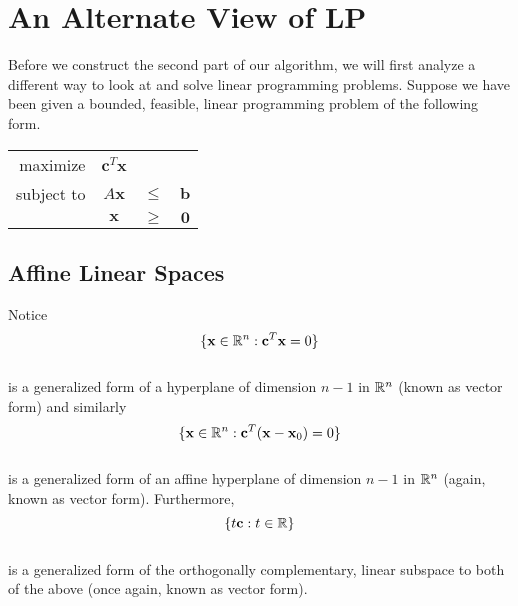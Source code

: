 \documentclass[conference]{IEEEtran}
\numberwithin{equation}{section}
\numberwithin{figure}{section}
\theoremstyle{plain}
\theoremstyle{definition}
\newcommand{\R}{\ensuremath \mathbb{R}}
\newcommand{\1}{\ensuremath \mathbbm{1}}
\begin{document}
\section{An Alternate View of LP}
Before we construct the second part of our algorithm, we will first analyze a 
different way to look at and solve linear programming problems. Suppose we have 
been given a bounded, feasible, linear programming problem of the following form. \\
\begin{center}\begin{tabular}{rccc}
  maximize   & $\mathbf{c}^T\mathbf{x}$ &        &              \\
  subject to & $A\mathbf{x}$            & $\leq$ & $\mathbf{b}$ \\
             & $\mathbf{x}$             & $\geq$ & $\mathbf{0}$ \\
\end{tabular}\end{center}

\subsection{Affine Linear Spaces}
Notice \\
\[\{\mathbf{x} \in \R^n : \mathbf{c}^T\mathbf{x} = 0\}\] \\ 
is a generalized form of a hyperplane of dimension $n-1$ in $\R^n$ (known as 
vector form) and similarly \\
\[\{\mathbf{x} \in \R^n : \mathbf{c}^T(\mathbf{x} - \mathbf{x}_0) = 0\}\] \\
is a generalized form of an affine hyperplane of dimension $n-1$ in $\R^n$ 
(again, known as vector form). Furthermore, \\
\[\{t\mathbf{c} : t \in \R\}\] \\
is a generalized form of the orthogonally complementary, linear subspace to both 
of the above (once again, known as vector form). \\ 
\end{document}
